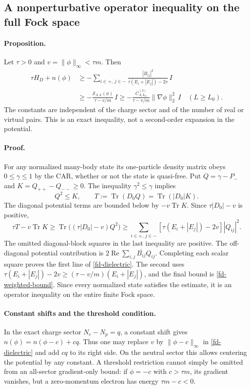 \subsection{A nonperturbative operator inequality on the full Fock space}

\paragraph{Proposition.}
Let $\tau>0$ and $v=\|\phi\|_\infty<\tau m$.  Then
\begin{align}
 \tau H_D+n(\phi)
 &\ge-\sum_{i\in+,\,j\in-}
       \frac{|B_{ij}|^2}{\tau(E_i+|E_j|)-2v}\,I\nonumber\\
 &\ge-\frac{\mathcal S_{\Lambda,L}(\phi)}{\tau-v/m}\,I
 \ge-\frac{\overline C^{(3)}_{\Lambda,L_0}}
                 {\tau-v/m}\|\nabla\phi\|_2^2\,I
 \quad(L\ge L_0).
 \label{fd-dielectric}
\end{align}
The constants are independent of the charge sector and of the number of
real or virtual pairs.  This is an exact inequality, not a second-order
expansion in the potential.

\paragraph{Proof.}
For any normalized many-body state its one-particle density matrix obeys
$0\le\gamma\le1$ by the CAR, whether or not the state is quasi-free.
Put $Q=\gamma-P_-$ and
$K=Q_{++}-Q_{--}\ge0$.  The inequality $\gamma^2\le\gamma$ implies
\begin{equation}
 Q^2\le K,
 \qquad T:=\operatorname{Tr}(D_0Q)
       =\operatorname{Tr}(|D_0|K).
 \label{fd-q-square}
\end{equation}
The diagonal potential terms are bounded below by
$-v\operatorname{Tr}K$.  Since $\tau|D_0|-v$ is positive,
\[
 \tau T-v\operatorname{Tr}K
 \ge\operatorname{Tr}\bigl((\tau|D_0|-v)Q^2\bigr)
 \ge\sum_{i\in+,\,j\in-}
       [\tau(E_i+|E_j|)-2v]|Q_{ij}|^2.
\]
The omitted diagonal-block squares in the last inequality are positive.
The off-diagonal potential contribution is
$2\operatorname{Re}\sum_{i,j}\overline{B_{ij}}Q_{ij}$.
Completing each scalar square proves the first line of
\eqref{fd-dielectric}.  The second uses
$\tau(E_i+|E_j|)-2v\ge(\tau-v/m)(E_i+|E_j|)$,
and the final bound is \eqref{fd-weighted-bound}.
Since every normalized state satisfies the estimate, it is an operator
inequality on the entire finite Fock space.

\paragraph{Constant shifts and the threshold condition.}
In the exact charge sector $N_e-N_p=q$, a constant shift gives
$n(\phi)=n(\phi-c)+cq$.  Thus one may replace $v$ by
$\|\phi-c\|_\infty$ in \eqref{fd-dielectric} and add $cq$ to its right
side.  On the neutral sector this allows centering the potential by any
constant.  A threshold restriction cannot simply be omitted from an
all-sector gradient-only bound: if $\phi=-c$ with $c>\tau m$, its gradient
vanishes, but a zero-momentum electron has energy $\tau m-c<0$.

